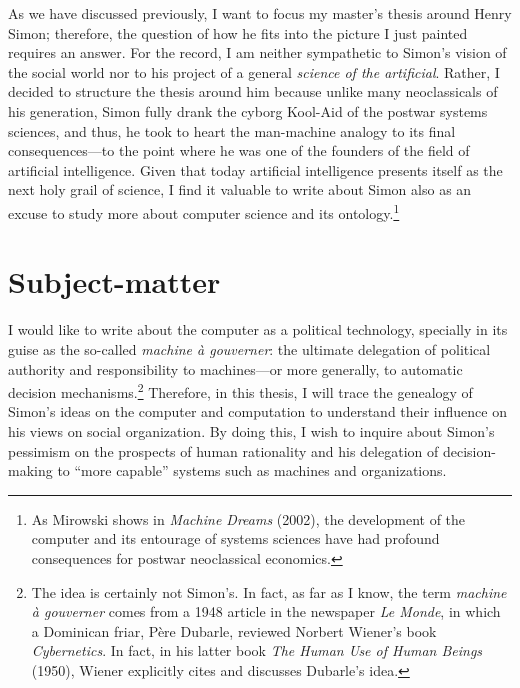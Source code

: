 \documentclass[paper=A4,portrait,twoside=true,twocolumn=true,headinclude=false,footinclude=false,fontsize=10,BCOR=15mm,DIV=13,pagesize=auto,titlepage=firstiscover,mpinclude=true,headings=twolinechapter,open=right,chapterprefix=false,numbers=noendperiod,headsepline=false,parskip=false]{scrbook}
\theoremstyle{definition}
\begin{document}
As we have discussed previously, I want to focus my master's thesis around
Henry Simon; therefore, the question of how he fits into the picture I just
painted requires an answer. For the record, I am neither sympathetic to
Simon's vision of the social world nor to his project of a general \emph{science
of the artificial}. Rather, I decided to structure the thesis around him
because unlike many neoclassicals of his generation, Simon fully drank the
cyborg Kool-Aid of the postwar systems sciences, and thus, he took to heart
the man-machine analogy to its final consequences---to the point where he
was one of the founders of the field of artificial intelligence. Given that
today artificial intelligence presents itself as the next holy grail of
science, I find it valuable to write about Simon also as an excuse to study
more about computer science and its ontology.\footnote{As Mirowski shows in \emph{Machine Dreams} (2002), the development of the
computer and its entourage of systems sciences have had profound
consequences for postwar neoclassical economics.} 
\section{Subject-matter}
\label{sec:orge6d36cb}
I would like to write about the computer as a political technology,
specially in its guise as the so-called \emph{machine à gouverner}: the ultimate
delegation of political authority and responsibility to machines---or more
generally, to automatic decision mechanisms.\footnote{The idea is certainly not Simon's. In fact, as far as I know, the
term \emph{machine à gouverner} comes from a 1948 article in the newspaper \emph{Le
Monde}, in which a Dominican friar, Père Dubarle, reviewed Norbert Wiener's
book \emph{Cybernetics}. In fact, in his latter book \emph{The Human Use of Human
Beings} (1950), Wiener explicitly cites and discusses Dubarle's idea.} Therefore, in this
thesis, I will trace the genealogy of Simon's ideas on the computer and
computation to understand their influence on his views on social
organization. By doing this, I wish to inquire about Simon's pessimism on
the prospects of human rationality and his delegation of decision-making to
``more capable'' systems such as machines and organizations.
\end{document}

